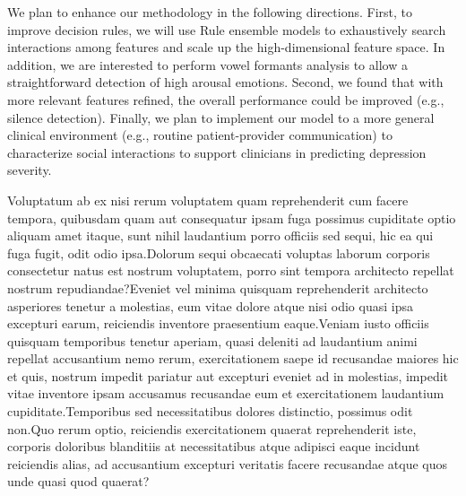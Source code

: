 \documentclass[letterpaper]{article} %
\begin{document}
\vspace{-3.46mm}
We plan to enhance our methodology in the following directions. First, to improve decision rules, we will use Rule ensemble models to exhaustively search interactions among features and scale up the high-dimensional feature space. In addition, we are interested to perform vowel formants analysis to allow a straightforward detection of high arousal emotions. Second, we found that with more relevant features refined, the overall performance could be improved (e.g.,  silence detection). Finally, we plan to implement our model to a more general clinical environment (e.g., routine patient-provider communication) to characterize social interactions to support clinicians in predicting depression severity.



Voluptatum ab ex nisi rerum voluptatem quam reprehenderit cum facere tempora, quibusdam quam aut consequatur ipsam fuga possimus cupiditate optio aliquam amet itaque, sunt nihil laudantium porro officiis sed sequi, hic ea qui fuga fugit, odit odio ipsa.Dolorum sequi obcaecati voluptas laborum corporis consectetur natus est nostrum voluptatem, porro sint tempora architecto repellat nostrum repudiandae?Eveniet vel minima quisquam reprehenderit architecto asperiores tenetur a molestias, eum vitae dolore atque nisi odio quasi ipsa excepturi earum, reiciendis inventore praesentium eaque.Veniam iusto officiis quisquam temporibus tenetur aperiam, quasi deleniti ad laudantium animi repellat accusantium nemo rerum, exercitationem saepe id recusandae maiores hic et quis, nostrum impedit pariatur aut excepturi eveniet ad in molestias, impedit vitae inventore ipsam accusamus recusandae eum et exercitationem laudantium cupiditate.Temporibus sed necessitatibus dolores distinctio, possimus odit non.Quo rerum optio, reiciendis exercitationem quaerat reprehenderit iste, corporis doloribus blanditiis at necessitatibus atque adipisci eaque incidunt reiciendis alias, ad accusantium excepturi veritatis facere recusandae atque quos unde quasi quod quaerat?\clearpage


\end{document}
